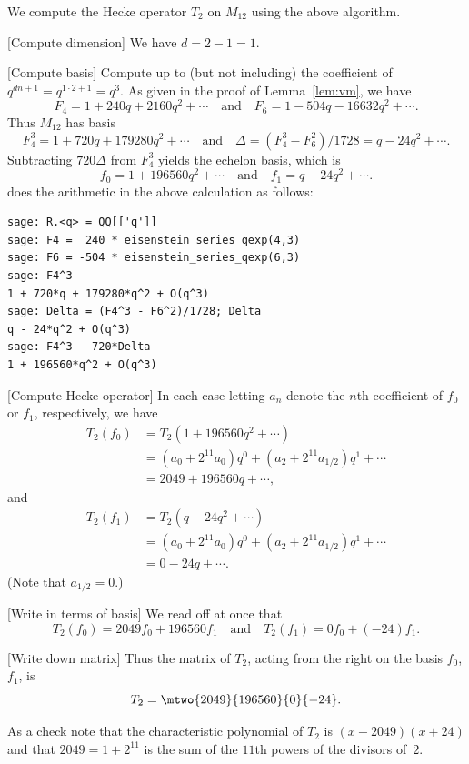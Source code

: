 \begin{example}
We compute the Hecke operator $T_2$ on $M_{12}$ using
the above algorithm.
\begin{steps}
\item{}[Compute dimension] We have $d=2 - 1 = 1$.
\item{}[Compute basis]  Compute up to (but not including)
the coefficient of $q^{dn+1} = q^{1\cdot 2 + 1} = q^3$.
As given in the proof of Lemma~\ref{lem:vm}, we have
$$
 F_4 = 1 + 240q + 2160q^2 + \cdots \quad\text{and}\quad
 F_6 = 1 - 504q - 16632q^2 + \cdots.
$$
Thus $M_{12}$ has basis
$$
 F_4^3 = 1 + 720q + 179280q^{2} + \cdots
\quad\text{and}\quad
 \Delta = (F_4^3 - F_6^2)/1728 = q - 24q^{2} + \cdots.
$$
Subtracting $720\Delta$ from $F_4^3$ yields the 
echelon basis, which is
$$
f_0 = 1 + 196560q^{2} + \cdots
\quad\text{and}\quad
f_1 = q - 24q^{2} + \cdots.
$$
%
\sage{} does the arithmetic in the above calculation
as follows:
\begin{verbatim}
sage: R.<q> = QQ[['q']]    
sage: F4 =  240 * eisenstein_series_qexp(4,3)
sage: F6 = -504 * eisenstein_series_qexp(6,3)
sage: F4^3
1 + 720*q + 179280*q^2 + O(q^3)
sage: Delta = (F4^3 - F6^2)/1728; Delta
q - 24*q^2 + O(q^3)
sage: F4^3 - 720*Delta
1 + 196560*q^2 + O(q^3)
\end{verbatim}

\item{}[Compute Hecke operator] In each case letting $a_n$ denote
the $n$th coefficient of $f_0$ or $f_1$, respectively, we have
\begin{align*}
  T_2(f_0) &= T_2 (1 + 196560q^{2} + \cdots) \\
           &= 
           (a_0 + 2^{11} a_0) q^0 + (a_2 + 2^{11} a_{1/2})q^1 + \cdots\\
           &= 2049  + 196560q + \cdots,
\end{align*}
and
\begin{align*}
  T_2(f_1) &= T_2 (q - 24q^{2} + \cdots) \\
           &= (a_0 + 2^{11} a_0) q^0 + (a_2 + 2^{11} a_{1/2})q^1 + \cdots\\
           &= 0 -24 q + \cdots.
\end{align*}
(Note that $a_{1/2} = 0$.)
         
\item{}[Write in terms of basis]
We read off at once that
$$
  T_2(f_0) = 2049 f_0 + 196560 f_1
\quad\text{and}\quad
 T_2(f_1) = 0 f_0 + (-24)f_1.
 $$

\item{}[Write down matrix] Thus the matrix of $T_2$, acting
from the right on the basis $f_0$, $f_1$, is 
$$
  T_2 = \mtwo{2049}{196560}{0}{-24}.
$$
\end{steps}
As a check note that the characteristic polynomial
of $T_2$ is $(x-2049)(x+24)$ and that 
$2049 = 1 + 2^{11}$ is the sum of the $11$th powers of the
divisors of~$2$.
\end{example}

